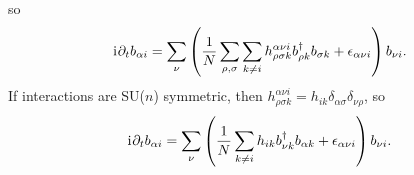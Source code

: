 \documentclass[nofootinbib,notitlepage,11pt]{revtex4-2}
\newcommand{\f}[2]{\dfrac{#1}{#2}} %
\newcommand{\p}[1]{\left(#1\right)} %
\renewcommand{\d}{\partial} %
\renewcommand{\i}{\mathrm{i}\mkern1mu} %
\newcommand{\1}{\mathds{1}}
\begin{document}
so
\begin{align}
  \i \d_t b_{\alpha i}
  = \sum_\nu \p{\f1N \sum_{\rho,\sigma} \sum_{k\ne i}
    h^{\alpha\nu i}_{\rho\sigma k} b_{\rho k}^\dag b_{\sigma k}
    + \epsilon_{\alpha\nu i}} b_{\nu i}.
\end{align}
If interactions are SU($n$) symmetric, then
$h^{\alpha\nu i}_{\rho\sigma k} = h_{ik}
\delta_{\alpha\sigma}\delta_{\nu\rho}$, so
\begin{align}
  \i \d_t b_{\alpha i}
  = \sum_\nu \p{\f1N \sum_{k\ne i} h_{ik} b_{\nu k}^\dag b_{\alpha k}
    + \epsilon_{\alpha\nu i}} b_{\nu i}.
\end{align}


\end{document}
